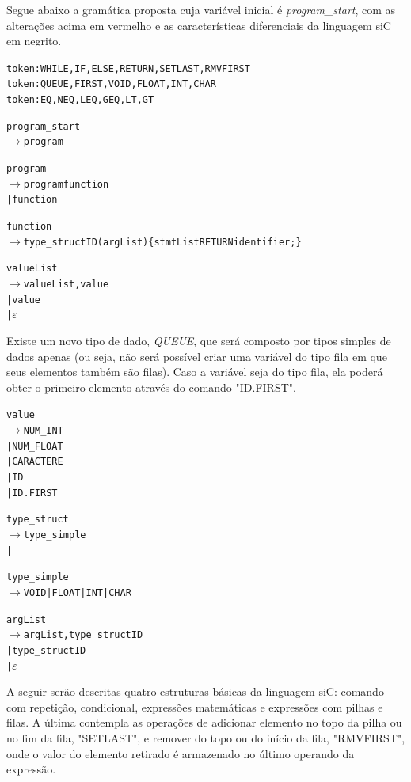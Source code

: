 \documentclass[12pt]{article}
\begin{document}
Segue abaixo a gramática proposta cuja variável inicial é \textit{program\_start}, com as alterações acima em vermelho e as características diferenciais da linguagem siC em negrito.


\begin{alltt}{\footnotesize
token: WHILE, IF, ELSE, RETURN, {\color{red}SETLAST}, {\color{red}RMVFIRST}
token: QUEUE, FIRST, VOID, FLOAT, INT, CHAR
token: {\color{red}EQ, NEQ, LEQ, GEQ, LT, GT}

{\color{red}program_start
   \(\to\) program}

{\color{red}program
   \(\to\) program function
   | function}

function
   \(\to\) {\color{red}type\_struct ID} ( argList ) \{ stmtList RETURN identifier ; \}
    
{\color{red}valueList
	\(\to\) valueList , value
	| value
	| \(\varepsilon\)}
	
}\end{alltt}
\indent Existe um novo tipo de dado, \textit{QUEUE}, que será composto por tipos simples de dados apenas (ou seja, não será possível criar uma variável do tipo fila em que seus elementos também são filas). Caso a variável seja do tipo fila, ela poderá obter o primeiro elemento através do comando "ID.FIRST".
\begin{alltt}{\footnotesize    	
	
{\color{red}value
	\(\to\) NUM\_INT
	| NUM\_FLOAT
	| CARACTERE
	| ID
	| ID . FIRST}
	
type\_struct
   \(\to\) type\_simple
    | \color{red}{QUEUE GT type\_simple LT}
    
type\_simple
   \(\to\) VOID | FLOAT | INT | CHAR  

argList
   \(\to\) argList , {\color{red}type\_struct ID}
   | {\color{red}type\_struct ID}
   | \(\varepsilon\)

   
}\end{alltt}
\indent A seguir serão descritas quatro estruturas básicas da linguagem siC: comando com repetição, condicional, expressões matemáticas e expressões com pilhas e filas. A última contempla as operações de adicionar elemento no topo da pilha ou no fim da fila, "SETLAST", e remover do topo ou do início da fila, "RMVFIRST", onde o valor do elemento retirado é armazenado no último operando da expressão.
\end{document}

